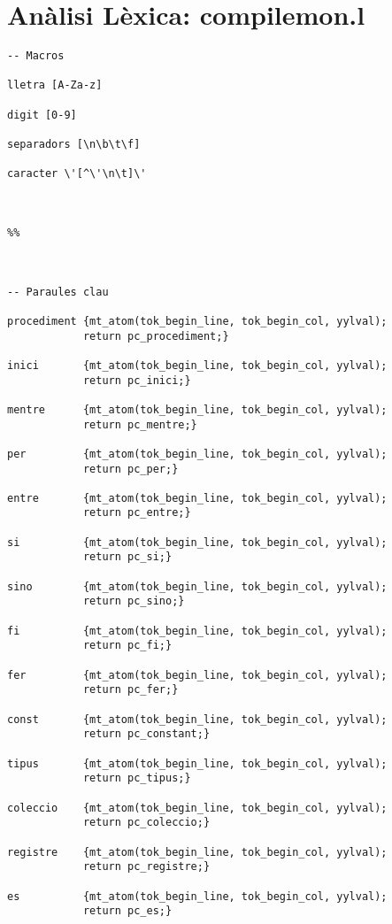 \documentclass[10pt]{report}
\begin{document}
    \section{Anàlisi Lèxica: compilemon.l}
    \begin{lstlisting}[style=Ada]
-- Macros

lletra [A-Za-z]

digit [0-9]

separadors [\n\b\t\f]

caracter \'[^\'\n\t]\'



%%



-- Paraules clau

procediment {mt_atom(tok_begin_line, tok_begin_col, yylval); 
            return pc_procediment;} 

inici       {mt_atom(tok_begin_line, tok_begin_col, yylval); 
            return pc_inici;}

mentre      {mt_atom(tok_begin_line, tok_begin_col, yylval); 
            return pc_mentre;}

per         {mt_atom(tok_begin_line, tok_begin_col, yylval); 
            return pc_per;}

entre       {mt_atom(tok_begin_line, tok_begin_col, yylval); 
            return pc_entre;}

si          {mt_atom(tok_begin_line, tok_begin_col, yylval); 
            return pc_si;}

sino        {mt_atom(tok_begin_line, tok_begin_col, yylval); 
            return pc_sino;}

fi          {mt_atom(tok_begin_line, tok_begin_col, yylval); 
            return pc_fi;}

fer         {mt_atom(tok_begin_line, tok_begin_col, yylval); 
            return pc_fer;}

const       {mt_atom(tok_begin_line, tok_begin_col, yylval); 
            return pc_constant;}

tipus       {mt_atom(tok_begin_line, tok_begin_col, yylval); 
            return pc_tipus;}

coleccio    {mt_atom(tok_begin_line, tok_begin_col, yylval); 
            return pc_coleccio;}

registre    {mt_atom(tok_begin_line, tok_begin_col, yylval); 
            return pc_registre;}

es          {mt_atom(tok_begin_line, tok_begin_col, yylval); 
            return pc_es;}


\end{lstlisting}
\end{document}
